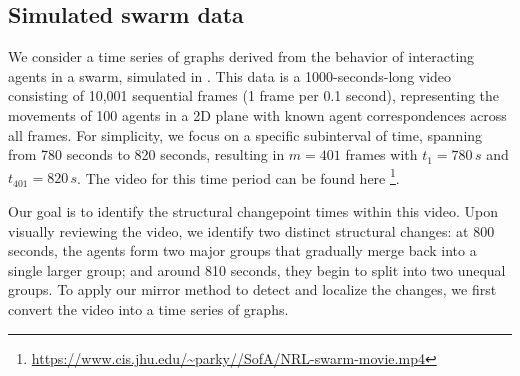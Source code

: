 \documentclass[12pt]{article}
\theoremstyle{definition}
\begin{document}
\subsection{Simulated swarm data}\label{sec:Simulations_Swarm}

We consider a time series of graphs derived from the behavior of interacting agents in a swarm, simulated in \cite{hindes2024swarming}. This data is a 1000-seconds-long video consisting of 10,001 sequential frames (1 frame per 0.1 second), representing the movements of 100 agents in a 2D plane with known agent correspondences across all frames.
For simplicity, we focus on a specific subinterval of time, spanning from 780 seconds to 820 seconds, resulting in \( m = 401 \) frames with \( t_1 = 780 \, s \) and \( t_{401} = 820 \, s \).
The video for this time period can be found here \footnote{\url{https://www.cis.jhu.edu/~parky//SofA/NRL-swarm-movie.mp4}}. 

Our goal is to identify the structural changepoint times within this video.
Upon visually reviewing the video, we identify two distinct structural changes: at 800 seconds, the agents form two major groups that gradually merge back into a single larger group; and around 810 seconds, they begin to split into two unequal groups.
To apply our mirror method to detect and localize the changes, we first convert the video into a time series of graphs.
\end{document}
